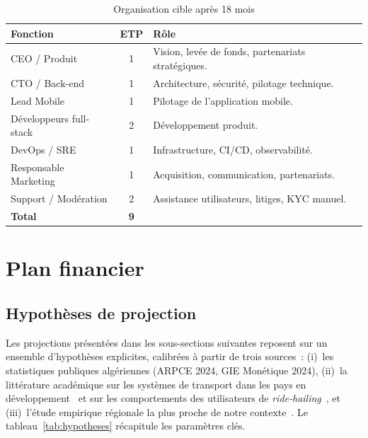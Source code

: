 \begin{table}[H]
\centering
\begin{tabularx}{\textwidth}{|l|c|X|}
\hline
\rowcolor{rohlight}
\textbf{Fonction} & \textbf{ETP} & \textbf{Rôle} \\
\hline
CEO / Produit & 1 & Vision, levée de fonds, partenariats stratégiques. \\
\hline
CTO / Back-end & 1 & Architecture, sécurité, pilotage technique. \\
\hline
Lead Mobile & 1 & Pilotage de l'application mobile. \\
\hline
Développeurs full-stack & 2 & Développement produit. \\
\hline
DevOps / SRE & 1 & Infrastructure, CI/CD, observabilité. \\
\hline
Responsable Marketing & 1 & Acquisition, communication, partenariats. \\
\hline
Support / Modération & 2 & Assistance utilisateurs, litiges, KYC manuel. \\
\hline
\textbf{Total} & \textbf{9} & \\
\hline
\end{tabularx}
  \caption{Organisation cible après 18 mois}
\end{table}

\section{Plan financier}

\subsection{Hypothèses de projection}
\label{sec:hypotheses}

Les projections présentées dans les sous-sections suivantes reposent sur un ensemble d'hypothèses explicites, calibrées à partir de trois sources~: (i)~les statistiques publiques algériennes (ARPCE 2024, GIE Monétique 2024), (ii)~la littérature académique sur les systèmes de transport dans les pays en développement~\cite{sogbe_public_transport_2024} et sur les comportements des utilisateurs de \textit{ride-hailing}~\cite{amri_ride_hailing_2024}, et (iii)~l'étude empirique régionale la plus proche de notre contexte~\cite{naim_yassir_2024}. Le tableau~\ref{tab:hypotheses} récapitule les paramètres clés.

